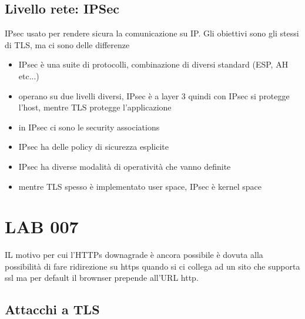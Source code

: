 \documentclass[12pt, oneside]{extbook} %
\begin{document}
\subsection{Livello rete: IPSec}
IPsec usato per rendere sicura la comunicazione su IP. Gli obiettivi sono gli stessi di TLS, ma ci sono delle differenze
\begin{itemize}
\item IPsec è una suite di protocolli, combinazione di diversi standard (ESP, AH etc...)
\item operano su due livelli diversi, IPsec è a layer 3 quindi con IPsec si protegge l'host, mentre TLS protegge l'applicazione
\item in IPsec ci sono le security associations
\item IPsec ha delle policy di sicurezza esplicite
\item IPsec ha diverse modalità di operatività che vanno definite
\item mentre TLS spesso è implementato user space, IPsec è kernel space
\end{itemize}
\section*{LAB 007}
IL motivo per cui l'HTTPs downagrade è ancora possibile è dovuta alla possibilità di fare ridirezione su https quando si ci collega ad un sito che supporta ssl ma per default il brownser prepende all'URL http.
\subsection{Attacchi a TLS}
\end{document}
